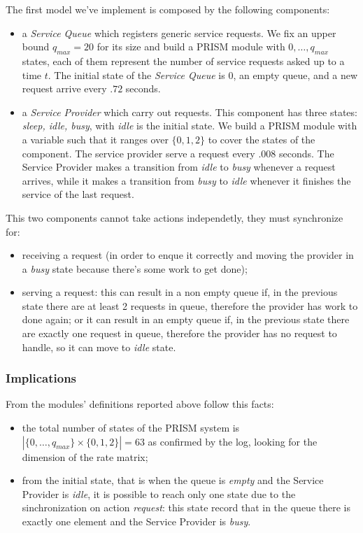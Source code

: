 The first model we've implement is composed by the following
components:
\begin{itemize}
\item a \emph{Service Queue} which registers generic service
  requests. We fix an upper bound $q_{max} = 20$ for its size and
  build a PRISM module with $0,\ldots,q_{max}$ states, each of them
  represent the number of service requests asked up to a time $t$. The
  initial state of the \emph{Service Queue} is $0$, an empty queue,
  and a new request arrive every $.72$ seconds.
\item a \emph{Service Provider} which carry out requests. This
  component has three states: \emph{sleep, idle, busy}, with
  \emph{idle} is the initial state. We build a PRISM module with a
  variable such that it ranges over $\{0,1,2\}$ to cover the states of
  the component. The service provider serve a request every $.008$
  seconds. The Service Provider makes a transition from \emph{idle} to
  \emph{busy} whenever a request arrives, while it makes a transition
  from \emph{busy} to \emph{idle} whenever it finishes the service of
  the last request.
\end{itemize}
This two components cannot take actions independetly, they must
synchronize for:
\begin{itemize}
\item receiving a request (in order to enque it correctly and moving
  the provider in a \emph{busy} state because there's some work to get
  done);
\item serving a request: this can result in a non empty queue if, in
  the previous state there are at least 2 requests in queue, therefore
  the provider has work to done again; or it can result in an empty
  queue if, in the previous state there are exactly one request in
  queue, therefore the provider has no request to handle, so it can
  move to \emph{idle} state.
\end{itemize}

\subsubsection{Implications}

From the modules' definitions reported above follow this facts:
\begin{itemize}
\item the total number of states of the PRISM system is
  $|\{0,\ldots,q_{max}\} \times \{0,1,2\}| = 63$ as confirmed by the
  log, looking for the dimension of the rate matrix;
\item from the initial state, that is when the queue is \emph{empty}
  and the Service Provider is \emph{idle}, it is possible to reach
  only one state due to the sinchronization on action \emph{request}:
  this state record that in the queue there is exactly one element and
  the Service Provider is \emph{busy}.
\end{itemize}

